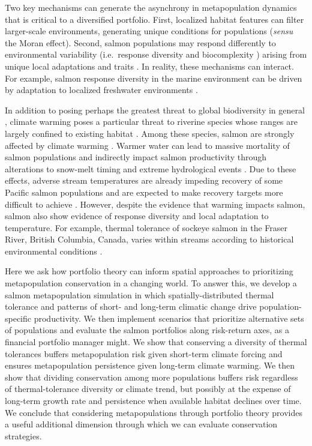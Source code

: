 \documentclass[12pt,english]{article}
\begin{document}
\begin{spacing}{1.3}
Two key mechanisms can generate the asynchrony in metapopulation dynamics that is critical to a diversified portfolio. First, localized habitat features can filter larger-scale environments, generating unique conditions for populations \citep{schindler2008} (\emph{sensu} the Moran effect). Second, salmon populations may respond differently to environmental variability (i.e.~response diversity \citep{elmqvist2003} and biocomplexity \citep{hilborn2003}) arising from unique local adaptations and traits \citep{fraser2011, eliason2011, thorson2014}. In reality, these mechanisms can interact. For example, salmon response diversity in the marine environment can be driven by adaptation to localized freshwater environments \citep{johnson2013a}.

In addition to posing perhaps the greatest threat to global biodiversity in general \citep{thomas2004}, climate warming poses a particular threat to riverine species whose ranges are largely confined to existing habitat \citep{thomas2010}. Among these species, salmon are strongly affected by climate warming \citep[e.g.][]{patterson2007}. Warmer water can lead to massive mortality of salmon populations \citep[e.g.][]{patterson2007} and indirectly impact salmon productivity through alterations to snow-melt timing and extreme hydrological events \citep{crozier2008}. Due to these effects, adverse stream temperatures are already impeding recovery of some Pacific salmon populations \citep{mccullough1999} and are expected to make recovery targets more difficult to achieve \citep{battin2007}. However, despite the evidence that warming impacts salmon, salmon also show evidence of response diversity and local adaptation to temperature. For example, thermal tolerance of sockeye salmon in the Fraser River, British Columbia, Canada, varies within streams according to historical environmental conditions \citep{eliason2011}.

Here we ask how portfolio theory can inform spatial approaches to prioritizing metapopulation conservation in a changing world. To answer this, we develop a salmon metapopulation simulation in which spatially-distributed thermal tolerance and patterns of short- and long-term climatic change drive population-specific productivity. We then implement scenarios that prioritize alternative sets of populations and evaluate the salmon portfolios along risk-return axes, as a financial portfolio manager might. We show that conserving a diversity of thermal tolerances buffers metapopulation risk given short-term climate forcing and ensures metapopulation persistence given long-term climate warming. We then show that dividing conservation among more populations buffers risk regardless of thermal-tolerance diversity or climate trend, but possibly at the expense of long-term growth rate and persistence when available habitat declines over time. We conclude that considering metapopulations through portfolio theory provides a useful additional dimension through which we can evaluate conservation strategies.


\end{spacing}
\end{document}
